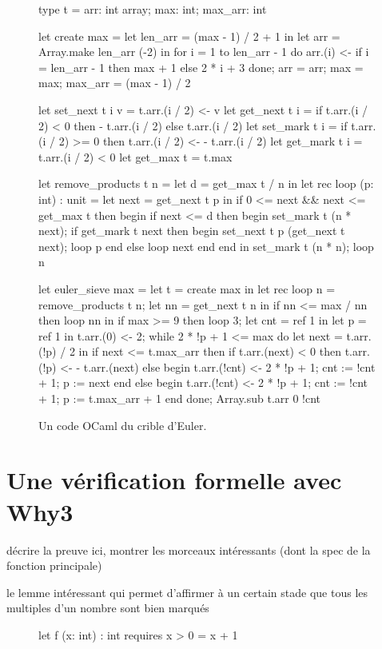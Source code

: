\documentclass[a4paper]{easychair}
\begin{document}
\begin{figure}[tp]
\begin{ocaml}
type t = { arr: int array; max: int; max_arr: int }

let create max =
  let len_arr = (max - 1) / 2 + 1 in
  let arr = Array.make len_arr (-2) in
  for i = 1 to len_arr - 1 do
    arr.(i) <- if i = len_arr - 1 then max + 1 else 2 * i + 3
  done;
  { arr = arr; max = max; max_arr = (max - 1) / 2 }

let set_next t i v = t.arr.(i / 2) <- v
let get_next t i = if t.arr.(i / 2) < 0 then - t.arr.(i / 2) else t.arr.(i / 2)
let set_mark t i = if t.arr.(i / 2) >= 0 then t.arr.(i / 2) <- - t.arr.(i / 2)
let get_mark t i = t.arr.(i / 2) < 0
let get_max t = t.max

let remove_products t n =
  let d = get_max t / n in
  let rec loop (p: int) : unit =
    let next = get_next t p in
    if 0 <= next && next <= get_max t then begin
      if next <= d then begin
        set_mark t (n * next);
        if get_mark t next then begin set_next t p (get_next t next); loop p end
        else loop next
      end end in
  set_mark t (n * n); loop n

let euler_sieve max =
  let t = create max in
  let rec loop n =
    remove_products t n;
    let nn = get_next t n in
    if nn <= max / nn then loop nn in
  if max >= 9 then loop 3;
  let cnt = ref 1 in
  let p = ref 1 in t.arr.(0) <- 2;
  while 2 * !p + 1 <= max do
    let next = t.arr.(!p) / 2 in
    if next <= t.max_arr then
      if t.arr.(next) < 0 then t.arr.(!p) <- - t.arr.(next)
      else begin t.arr.(!cnt) <- 2 * !p + 1; cnt := !cnt + 1; p := next end
    else begin t.arr.(!cnt) <- 2 * !p + 1; cnt := !cnt + 1; p := t.max_arr + 1 end
  done;
  Array.sub t.arr 0 !cnt
\end{ocaml}
\caption{Un code OCaml du crible d'Euler.}
\label{fig:codeOCaml}
\end{figure}

\section{Une vérification formelle avec Why3}

décrire la preuve ici, montrer les morceaux intéressants
(dont la spec de la fonction principale)

le lemme intéressant qui permet d'affirmer à un certain stade que tous les
multiples d'un nombre sont bien marqués

\begin{figure}
\begin{why3}
let f (x: int) : int
  requires { x > 0 }
= x + 1
\end{why3}
\end{figure}
\end{document}
